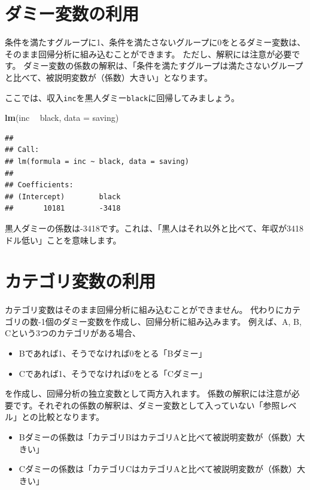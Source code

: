 \documentclass[]{book}
\newenvironment{Shaded}{\begin{snugshade}}{\end{snugshade}}
\newcommand{\KeywordTok}[1]{\textcolor[rgb]{0.13,0.29,0.53}{\textbf{#1}}}
\newcommand{\DataTypeTok}[1]{\textcolor[rgb]{0.13,0.29,0.53}{#1}}
\newcommand{\StringTok}[1]{\textcolor[rgb]{0.31,0.60,0.02}{#1}}
\newcommand{\OperatorTok}[1]{\textcolor[rgb]{0.81,0.36,0.00}{\textbf{#1}}}
\newcommand{\NormalTok}[1]{#1}
\providecommand{\tightlist}{%
  \setlength{\itemsep}{0pt}\setlength{\parskip}{0pt}}
\begin{document}
\section{ダミー変数の利用}\label{ux30c0ux30dfux30fcux5909ux6570ux306eux5229ux7528}

条件を満たすグループに1、条件を満たさないグループに0をとるダミー変数は、そのまま回帰分析に組み込むことができます。
ただし、解釈には注意が必要です。
ダミー変数の係数の解釈は、「条件を満たすグループは満たさないグループと比べて、被説明変数が（係数）大きい」となります。

ここでは、収入\texttt{inc}を黒人ダミー\texttt{black}に回帰してみましょう。

\begin{Shaded}
\begin{Highlighting}[]
\KeywordTok{lm}\NormalTok{(inc }\OperatorTok{~}\StringTok{ }\NormalTok{black, }\DataTypeTok{data =}\NormalTok{ saving)}
\end{Highlighting}
\end{Shaded}

\begin{verbatim}
## 
## Call:
## lm(formula = inc ~ black, data = saving)
## 
## Coefficients:
## (Intercept)        black  
##       10181        -3418
\end{verbatim}

黒人ダミーの係数は-3418です。これは、「黒人はそれ以外と比べて、年収が3418ドル低い」ことを意味します。

\section{カテゴリ変数の利用}\label{ux30abux30c6ux30b4ux30eaux5909ux6570ux306eux5229ux7528}

カテゴリ変数はそのまま回帰分析に組み込むことができません。
代わりにカテゴリの数-1個のダミー変数を作成し、回帰分析に組み込みます。
例えば、A, B, Cという3つのカテゴリがある場合、

\begin{itemize}
\tightlist
\item
  Bであれば1、そうでなければ0をとる「Bダミー」
\item
  Cであれば1、そうでなければ0をとる「Cダミー」
\end{itemize}

を作成し、回帰分析の独立変数として両方入れます。
係数の解釈には注意が必要です。それぞれの係数の解釈は、ダミー変数として入っていない「参照レベル」との比較となります。

\begin{itemize}
\tightlist
\item
  Bダミーの係数は「カテゴリBはカテゴリAと比べて被説明変数が（係数）大きい」
\item
  Cダミーの係数は「カテゴリCはカテゴリAと比べて被説明変数が（係数）大きい」
\end{itemize}
\end{document}
